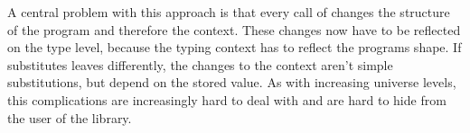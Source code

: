 A central problem with this approach is that every call of \AgdaFunction{>>=}
changes the structure of the program and therefore the context.
These changes now have to be reflected on the type level, because the typing
context has to reflect the programs shape.
If \AgdaFunction{>>=} substitutes leaves differently, the changes to the context
aren't simple substitutions, but depend on the stored value.
As with increasing universe levels, this complications are increasingly hard to
deal with and are hard to hide from the user of the library.

